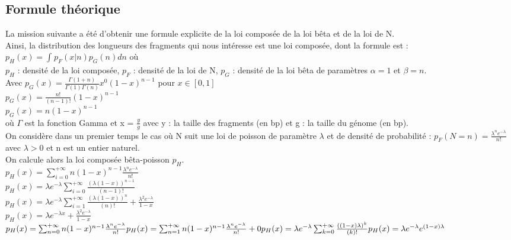 \documentclass[11pt,a4paper]{article} %
\begin{document}
\subsection{Formule théorique}
La mission suivante a été d'obtenir une formule explicite de la loi composée de la loi bêta et de la loi de N. \\
Ainsi, la distribution des longueurs des fragments qui nous intéresse est une loi composée, dont la formule est : \\
$p_{H}(x) = \int_{}^{}p_{F}(x|n)p_{G}(n)dn$ où \\
$p_{H}$ : densité de la loi composée, $p_{F}$ : densité de la loi de N, $p_{G}$ : densité de la loi bêta de paramètres $\alpha = 1$ et $\beta=n$. \\ 
Avec $p_{G}(x) = \frac{\Gamma(1+n)}{\Gamma(1)\Gamma(n)}x^0(1-x)^{n-1}$ pour $x\in[0,1]$\\
$ p_{G}(x) = \frac{n!}{(n-1)!}(1-x)^{n-1}$ \\
$ p_{G}(x) = n(1-x)^{n-1}$ \\
où $\Gamma$ est la fonction Gamma et x = $\frac{y}{g}$ avec y : la taille des fragments (en bp) et g : la taille du génome (en bp).\\
On considère dans un premier temps le cas où N suit une loi de poisson de paramètre $\lambda$ et de densité de probabilité : $p_{F}(N=n) =\frac{\lambda^{n}e^{-\lambda}}{n!}$ \\
avec $\lambda >0 $ et n est un entier naturel. \\
On calcule alors la loi composée bêta-poisson $p_{H}$.\\
$p_{H}(x) = \sum_{i=0}^{+\infty}n(1-x)^{n-1}\frac{\lambda^{n}e^{-\lambda}}{n!}$\\
$p_{H}(x)= \lambda e^{-\lambda}\sum_{i=0}^{+\infty}\frac{(\lambda (1-x))^{n-1}}{(n-1)!}$ \\
$p_{H}(x)= \lambda e^{-\lambda}\sum_{i=1}^{+\infty}\frac{(\lambda (1-x))^{n}}{(n)!} + \frac{\lambda^{2}e^{-\lambda}}{1-x}$ \\
$p_{H}(x)= \lambda e^{-\lambda x} + \frac{\lambda^{2}e^{-\lambda}}{1-x}$ \\
$p_{H}(x) = \sum_{n=0}^{+\infty}n(1-x)^{n-1}\frac{\lambda^{n}e^{-\lambda}}{n!} \\ p_{H}(x) = \sum_{n=1}^{+\infty}n(1-x)^{n-1}\frac{\lambda^{n}e^{-\lambda}}{n!} + 0 \\
p_{H}(x) = \lambda e^{-\lambda}\sum_{k=0}^{+\infty}\frac{((1-x)\lambda)^{k}}{(k)!} \\
p_{H}(x) = \lambda e^{-\lambda}e^{(1-x)\lambda}$ \\
\end{document}
